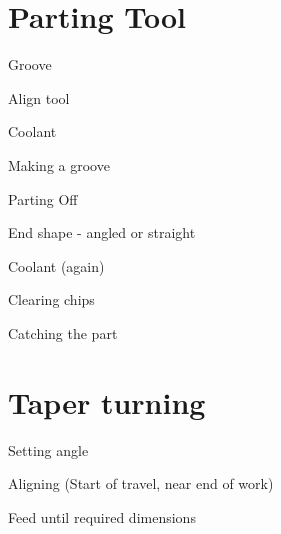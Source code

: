 \documentclass[11pt,a5paper,twoside,openany]{book}
\newenvironment{checklist}{
  \begin{list}{}{}
  
}{%
  \end{list}
}
\begin{document}
\chapter{Parting Tool}
	\begin{checklist}
	\item Groove
		\begin{checklist}
		\item Align tool
		\item Coolant
		\item Making a groove
		\end{checklist}
	\item Parting Off
		\begin{checklist}
		\item End shape - angled or straight
		\item Coolant (again)
		\item Clearing chips
		\item Catching the part
		\end{checklist}
	\end{checklist}

\chapter{Taper turning}
	\begin{checklist}
	\item Setting angle
	\item Aligning (Start of travel, near end of work)
	\item Feed until required dimensions
	\end{checklist}
\end{document}
